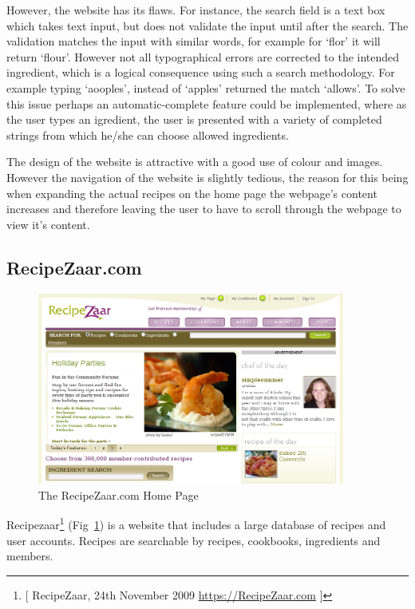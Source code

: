 However, the website has its flaws. For instance, the search field is a text box which takes text input, but does not validate the input until after the search. The validation matches the input with similar words, for example for ‘flor’ it will return ‘flour’. However not all typographical errors are corrected to the intended ingredient, which is a logical consequence using such a search methodology. For example typing ‘aooples’, instead of ‘apples’ returned the match ‘allows’. To solve this issue perhaps an automatic-complete feature could be implemented, where as the user types an igredient, the user is presented with a variety of completed strings from which he/she can choose allowed ingredients.

The design of the website is attractive with a good use of colour and images. However the navigation of the website is slightly tedious, the reason for this being when expanding the actual recipes on the home page the webpage’s content increases and therefore leaving the user to have to scroll through the webpage to view it’s content.

\subsection{RecipeZaar.com}

\begin{figure}[h]
\includegraphics[width=0.9\textwidth]{screenshot_recipezaar}
\caption{The RecipeZaar.com Home Page}
\label{fig:recipezaar}
\end{figure}

Recipezaar\footnote{[ RecipeZaar, 24th November 2009 \url{https://RecipeZaar.com} ]} (Fig~\ref{fig:recipezaar}) is a website that includes a large database of recipes and user accounts. Recipes are searchable by recipes, cookbooks, ingredients and members. 

